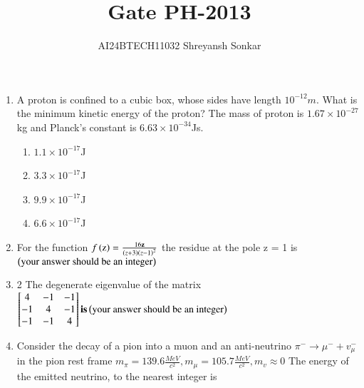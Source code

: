 \documentclass[journal]{IEEEtran}
\begin{document}

\vspace{3cm}


\renewcommand{\thefigure}{\theenumi}
\renewcommand{\thetable}{\theenumi}
\setlength{\intextsep}{10pt} %


\renewcommand{\thetable}{\theenumi}

\title{Gate PH-2013}
\author{AI24BTECH11032 Shreyansh Sonkar
}
\maketitle
\renewcommand{\thefigure}{\theenumi}
\renewcommand{\thetable}{\theenumi}
\begin{enumerate}[start=40]
\item A proton is confined to a cubic box, whose sides have length $10^{-12}m$. What is the minimum kinetic energy of the proton? The mass of proton is $1.67\times10^{-27}$kg and Planck's constant is
$6.63\times10^{-34}$Js.
\begin{multicols}{4}
    \begin{enumerate}
        \item $1.1\times10^{-17}$J
        \item $3.3\times10^{-17}$J
        \item $9.9\times10^{-17}$J
        \item $6.6\times10^{-17}$J
    \end{enumerate}
\end{multicols}
\bigskip
\item For the function $f\left(\text{z}\right)=\frac{16\textbf{z}}{\left(z+3\right)\left(z-1\right)^{2}}$ the residue at the pole z = 1 is $\left(\text{your answer should be an integer}\right)$
\bigskip
\item 2 The degenerate eigenvalue of the matrix\\ $\begin{bmatrix}
4 & -1 & -1 \\
-1 & 4 & -1 \\
-1 & -1 & 4 \\
\end{bmatrix}  \textbf{is} \left(\text{your answer should be an integer}\right)$
\bigskip
\item Consider the decay of a pion into a muon and an anti-neutrino $\pi^{-}\to\mu^{-}+v_{\mu}^{-}$ in the pion rest frame $m_{\pi}=139.6\frac{MeV}{c^{2}},m_{\mu}=105.7\frac{MeV}{c^{2}},m_{v}\approx 0$ The energy  of the emitted neutrino, to the nearest integer is

\end{enumerate}
\end{document}
